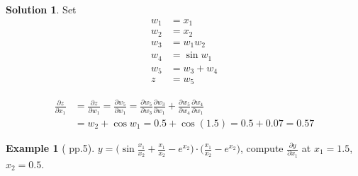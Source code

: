 \documentclass[10pt]{extarticle}
\newcommand{\ds}{\displaystyle}
\theoremstyle{definition}
\newtheorem*{ex}{Example}
\newtheorem*{sol}{Solution}
\begin{document}
\begin{sol}
  Set 
  \begin{align*}
    w_1 &= x_1 \\
    w_2 &= x_2 \\
    w_3 &= w_1 w_2 \\
    w_4 &= \sin w_1 \\
    w_5 &= w_3 + w_4 \\
    z & = w_5
  \end{align*}
  
  \begin{align*}
    \frac{\partial z}{\partial x_1} &= \frac{\partial z}{\partial w_1} = \frac{\partial w_5}{\partial w_1} = \frac{\partial w_5}{\partial w_3}\frac{\partial w_3}{\partial w_1} + \frac{\partial w_5}{\partial w_4}\frac{\partial w_4}{\partial w_1} \\ &= w_2 + \cos w_1 = 0.5 + \cos(1.5) = 0.5 + 0.07 = 0.57
  \end{align*}
\end{sol}

\newpage

\begin{ex}[\citet{griewank} pp.5]
  $\ds y = \Big(\sin\frac{x_1}{x_2} + \frac{x_1}{x_2} - e^{x_2}\Big)\cdot\Big(\frac{x_1}{x_2} - e^{x_2}\Big)$, compute $\ds\frac{\partial y}{\partial x_1}$ at $x_1 = 1.5$, $x_2 = 0.5$.
\end{ex}
\end{document}

